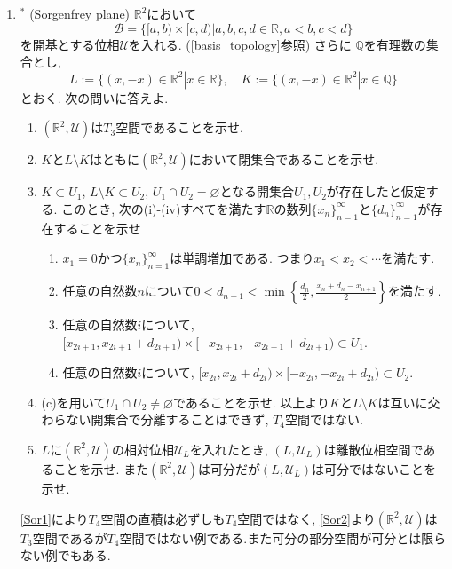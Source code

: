 \documentclass[dvipdfmx,a4paper,11pt]{article}
\newcommand{\R}{\mathbb{R}}
\newcommand{\Q}{\mathbb{Q}}
\theoremstyle{definition}
\begin{document}
\begin{enumerate}[label=\textbf{問}\ref*{sec-countable}.\arabic*]
\item  $^{*}$  \label{Sor2} (Sorgenfrey plane) $\R^2$において
$$
\mathscr{B} = \{[a,b) \times [c,d) | a,b,c,d \in \R, a<b, c<d\} 
$$
を開基とする位相$\mathscr{U}$を入れる. (\ref{basis_topology}参照)
さらに $\Q$を有理数の集合とし, 
$$L := \{ (x, -x )\in \R^2 | x \in \R\}, \quad K := \{ (x, -x )\in \R^2 | x \in \Q\}$$
とおく. 次の問いに答えよ. 
\begin{enumerate}
	\setlength{\parskip}{0cm} 
  \setlength{\itemsep}{0pt} 
\item $(\R^2,\mathscr{U})$は$T_3$空間であることを示せ. 
\item $K$と$L \setminus K$はともに$(\R^2,\mathscr{U})$において閉集合であることを示せ. 
\item $K \subset U_1$, $L \setminus K \subset U_2$, $U_1 \cap U_2 =\varnothing $となる開集合$U_1, U_2$が存在したと仮定する.
このとき, 次の(i)-(iv)すべてを満たす$\R$の数列$\{x_n \}_{n=1}^{\infty}$と$\{ d_n\}_{n=1}^{\infty}$が存在することを示せ
\begin{enumerate}[label=(\roman*)]
\item $x_1 =0$かつ$\{x_n \}_{n=1}^{\infty}$は単調増加である. つまり$x_1 < x_2 < \cdots$を満たす.
\item 任意の自然数$n$について$0 < d_{n+1} < \min \left\{ \frac{d_n}{2}, \frac{x_n + d_n - x_{n+1}}{2}\right\}$を満たす.
\item 任意の自然数$i$について, $[x_{2i+1}, x_{2i+1}+ d_{2i+1}) \times [-x_{2i+1}, -x_{2i+1}+ d_{2i+1})\subset U_1$.
\item 任意の自然数$i$について, $[x_{2i}, x_{2i}+ d_{2i}) \times [-x_{2i}, -x_{2i}+ d_{2i})\subset U_2$.
\end{enumerate}
\item (c)を用いて$U_1 \cap U_2  \neq \varnothing $であることを示せ. 以上より$K$と$L \setminus K$は互いに交わらない開集合で分離することはできず, $T_4$空間ではない.
\item $L$に$(\R^2,\mathscr{U})$の相対位相$\mathscr{U}_L$を入れたとき, $(L,\mathscr{U}_L)$は離散位相空間であることを示せ. また$(\R^2,\mathscr{U})$は可分だが$(L,\mathscr{U}_L)$は可分ではないことを示せ.
\end{enumerate}
\ref{Sor1}により$T_4$空間の直積は必ずしも$T_4$空間ではなく, \ref{Sor2}より$(\R^2,\mathscr{U})$は$T_3$空間であるが$T_4$空間ではない例である.また可分の部分空間が可分とは限らない例でもある.
\end{enumerate}
\end{document}
